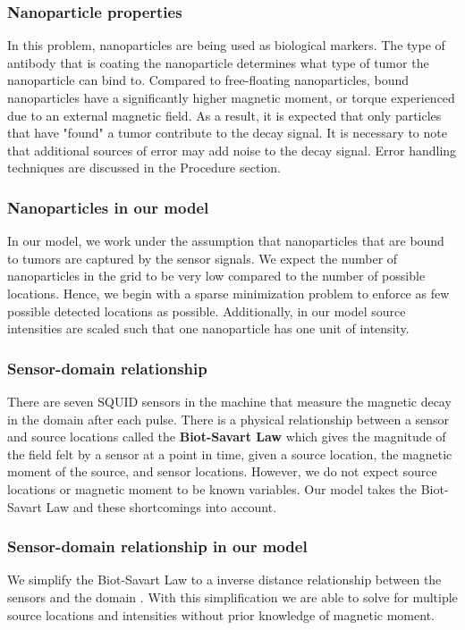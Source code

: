 \documentclass[a4paper]{article}
\begin{document}
\subsubsection*{Nanoparticle properties}
In this problem, nanoparticles are being used as biological markers. The type of antibody that is coating the nanoparticle determines what type of tumor the nanoparticle can bind to. Compared to free-floating nanoparticles, bound nanoparticles have a significantly higher magnetic moment, or torque experienced due to an external magnetic field. As a result, it is expected that only particles that have "found" a tumor contribute to the decay signal. It is necessary to note that additional sources of error may add noise to the decay signal. Error handling techniques are discussed in the Procedure section.

\subsubsection*{Nanoparticles in our model}
In our model, we work under the assumption that nanoparticles that are bound to tumors are captured by the sensor signals. We expect the number of nanoparticles in the grid to be very low compared to the number of possible locations. Hence, we begin with a sparse minimization problem to enforce as few possible detected locations as possible. Additionally, in our model source intensities are scaled such that one nanoparticle has one unit of intensity. 

\subsubsection*{Sensor-domain relationship}
There are seven SQUID sensors in the machine that measure the magnetic decay in the domain after each pulse. There is a physical relationship between a sensor and source locations called the \textbf{Biot-Savart Law} which gives the magnitude of the field felt by a sensor at a point in time, given a source location, the magnetic moment of the source, and sensor locations. However, we do not expect source locations or magnetic moment to be known variables. Our model takes the Biot-Savart Law and these shortcomings into account.

\subsubsection*{Sensor-domain relationship in our model}
We simplify the Biot-Savart Law to a inverse distance relationship between the sensors and the domain \cite{Liu}. With this simplification we are able to solve for multiple source locations and intensities without prior knowledge of magnetic moment. 
\end{document}
